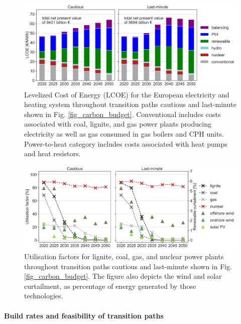 \documentclass[5p]{elsarticle} %
\begin{document}
\begin{figure}[!h]
\centering
\includegraphics[width=12cm]{figures/LCOE.png}
\caption{Levelized Cost of Energy (LCOE) for the European electricity and heating system throughout transition paths cautious and last-minute shown in Fig. \ref{fig_carbon_budget}. Conventional includes costs associated with coal, lignite, and gas power plants producing electricity as well as gas consumed in gas boilers and CPH units. Power-to-heat category includes costs associated with heat pumps and heat resistors. } \label{fig_system_cost} 
\end{figure}

\begin{figure}[!h]
\centering
\includegraphics[width=\columnwidth]{figures/utilisation_factors.png}
\caption{Utilisation factors for lignite, coal, gas, and nuclear power plants throughout transition paths cautious and last-minute shown in Fig. \ref{fig_carbon_budget}. The figure also depicts the wind and solar curtailment, as percentage of energy generated by those technologies. } \label{fig_utilisation_factors} 
\end{figure}


\paragraph{\textbf{Build rates and feasibility of transition paths}} \
\end{document}
